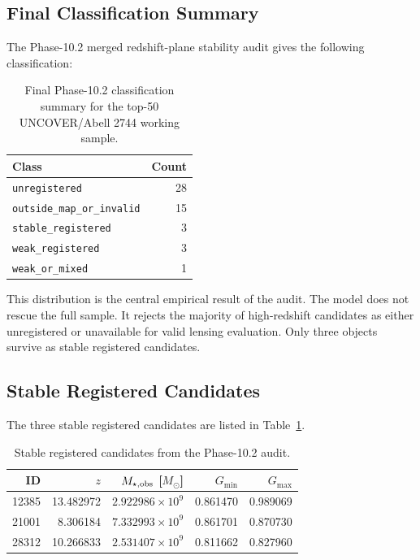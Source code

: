 \documentclass[11pt,a4paper]{article}
\newcommand{\Msun}{M_\odot}
\begin{document}
\subsection{Final Classification Summary}

The Phase-10.2 merged redshift-plane stability audit gives the following classification:
\begin{table}[H]
\centering
\caption{Final Phase-10.2 classification summary for the top-50 UNCOVER/Abell 2744 working sample.}
\begin{tabular}{lr}
\toprule
Class & Count \\
\midrule
\texttt{unregistered} & 28 \\
\texttt{outside\_map\_or\_invalid} & 15 \\
\texttt{stable\_registered} & 3 \\
\texttt{weak\_registered} & 3 \\
\texttt{weak\_or\_mixed} & 1 \\
\bottomrule
\end{tabular}
\end{table}

This distribution is the central empirical result of the audit. The model does not rescue the full sample. It rejects the majority of high-redshift candidates as either unregistered or unavailable for valid lensing evaluation. Only three objects survive as stable registered candidates.

\subsection{Stable Registered Candidates}

The three stable registered candidates are listed in Table~\ref{tab:stable}.
\begin{table}[H]
\centering
\caption{Stable registered candidates from the Phase-10.2 audit.}
\label{tab:stable}
\begin{tabular}{rrrrr}
\toprule
ID & $z$ & $M_{\star,\rm obs}$ [$\Msun$] & $G_{\min}$ & $G_{\max}$ \\
\midrule
12385 & 13.482972 & $2.922986\times10^9$ & 0.861470 & 0.989069 \\
21001 & 8.306184 & $7.332993\times10^9$ & 0.861701 & 0.870730 \\
28312 & 10.266833 & $2.531407\times10^9$ & 0.811662 & 0.827960 \\
\bottomrule
\end{tabular}
\end{table}
\end{document}
